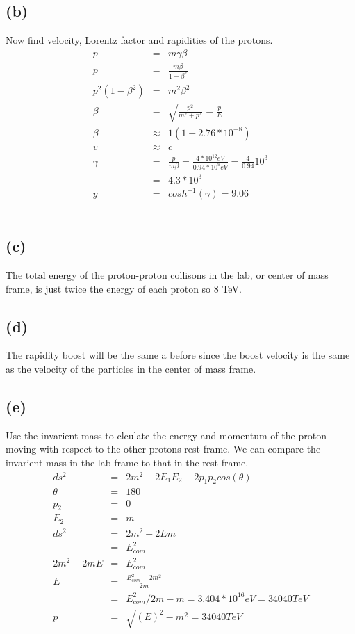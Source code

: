 \documentclass[11pt]{amsart}
\begin{document}
\subsection*{(b)} Now find velocity, Lorentz factor and rapidities of the protons. \\
\begin{eqnarray*}
p &=& m\gamma\beta \\
p &=& \frac{m\beta}{1-\beta^{2}} \\
p^{2}(1-\beta^{2}) &=& m^{2}\beta^{2} \\
\beta &=& \sqrt{\frac{p^{2}}{m^{2}+p^{2}}}= \frac{p}{E} \\
\beta &\approx& 1(1-2.76*10^{-8}) \\
v &\approx& c \\
\gamma &=& \frac{p}{m\beta} = \frac{4*10^{12}eV}{0.94*10^{9}eV} = \frac{4}{0.94}10^{3} \\
&=& 4.3*10^{3}  \\
y &=& cosh^{-1}(\gamma) = 9.06
\end{eqnarray*} \\
\subsection*{(c)} The total energy of the proton-proton collisons in the lab, or center of mass frame, is just twice the energy of each proton so 8 TeV. \\
\subsection*{(d)} The rapidity boost will be the same a before since the boost velocity is the same as the velocity of the particles in the center of mass frame. \\
\subsection*{(e)} Use the invarient mass to clculate the energy and momentum of the proton moving with respect to the other protons rest frame. We can compare the invarient mass in the lab frame to that in the rest frame. \\
\begin{eqnarray*}
ds^{2} &=& 2m^{2}+2E_{1}E_{2}-2p_{1}p_{2}cos(\theta) \\
\theta &=& 180 \\
p_{2} &=& 0 \\
E_{2} &=& m \\
ds^{2} &=& 2m^{2}+2Em \\
&=& E_{com}^{2} \\
2m^{2}+2mE &=& E_{com}^{2} \\
E &=& \frac{E_{com}^{2}-2m^{2}}{2m} \\
&=& E_{com}^{2}/2m-m = 3.404*10^{16} eV = 34040 TeV  \\
p &=& \sqrt{(E)^{2}-m^{2}} = 34040 TeV
\end{eqnarray*} \\
\end{document}
